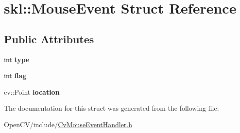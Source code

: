 \hypertarget{structskl_1_1_mouse_event}{}\section{skl\+:\+:Mouse\+Event Struct Reference}
\label{structskl_1_1_mouse_event}
\subsection*{Public Attributes}
\begin{DoxyCompactItemize}
\item 
\hypertarget{structskl_1_1_mouse_event_a85cc97d2e7f40d575a9c663565c9c1f4}{}\label{structskl_1_1_mouse_event_a85cc97d2e7f40d575a9c663565c9c1f4} 
int {\bfseries type}
\item 
\hypertarget{structskl_1_1_mouse_event_ae2f57097fb934e8581ed048520aa248a}{}\label{structskl_1_1_mouse_event_ae2f57097fb934e8581ed048520aa248a} 
int {\bfseries flag}
\item 
\hypertarget{structskl_1_1_mouse_event_a5cb63b13fca08b0981c34475b5ab383a}{}\label{structskl_1_1_mouse_event_a5cb63b13fca08b0981c34475b5ab383a} 
cv\+::\+Point {\bfseries location}
\end{DoxyCompactItemize}


The documentation for this struct was generated from the following file\+:\begin{DoxyCompactItemize}
\item 
Open\+C\+V/include/\hyperlink{_cv_mouse_event_handler_8h}{Cv\+Mouse\+Event\+Handler.\+h}\end{DoxyCompactItemize}
